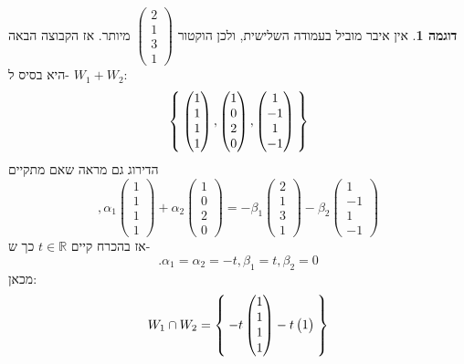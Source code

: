\documentclass[12pt]{report}
\theoremstyle{plain}
\theoremstyle{definition}
\newtheorem{example}{דוגמה}[chapter]
\newcommand{\R}{\mathbb{R}}
\newcommand{\0}{\mathbf{0}}
\begin{document}
\begin{example}
אין איבר מוביל בעמודה השלישית, ולכן הוקטור
$\begin{pmatrix}
2 \\
1 \\
3 \\
1   
\end{pmatrix}$
מיותר. אז הקבוצה הבאה היא בסיס ל-
$W_1+W_2$:
$$
\Set{\begin{pmatrix}
1 \\
1 \\
1 \\
1   
\end{pmatrix},\begin{pmatrix}
1 \\
0 \\
2 \\
0   
\end{pmatrix},\begin{pmatrix}
1 \\
-1 \\
1 \\
-1   
\end{pmatrix}}
$$
הדירוג גם מראה שאם מתקיים
$$
,\alpha_1\begin{pmatrix}
1 \\
1 \\
1 \\
1   
\end{pmatrix}+\alpha_2\begin{pmatrix}
1 \\
0 \\
2 \\
0   
\end{pmatrix}=-\beta_1\begin{pmatrix}
2 \\
1 \\
3 \\
1   
\end{pmatrix}-\beta_2\begin{pmatrix}
1 \\
-1 \\
1 \\
-1   
\end{pmatrix}
$$
אז בהכרח קיים 
$t\in\R$
כך ש-
$$
.\alpha_1=\alpha_2=-t,\beta_1=t,\beta_2=0
$$
מכאן:
$$
W_1\cap W_2=\Set{-t\begin{pmatrix}
1 \\
1 \\
1 \\
1   
\end{pmatrix}-t\begin{pmatrix}
1 \\

\end{pmatrix}}$$
\end{example}
\end{document}
